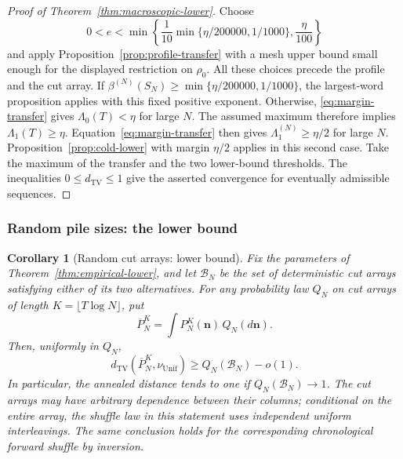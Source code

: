 \documentclass[11pt]{article}
\numberwithin{equation}{section}
\newtheorem{corollary}[theorem]{Corollary}
\theoremstyle{definition}
\theoremstyle{remark}
\newcommand{\TV}{\mathrm{TV}}
\newcommand{\Unif}{\mathrm{Unif}}
\newcommand{\dTV}{d_{\TV}}
\newcommand{\nuUnif}{\nu_{\Unif}}
\newcommand{\1}{\mathbf 1}
\begin{document}
\begin{proof}[Proof of Theorem~\ref{thm:macroscopic-lower}]
Choose
\[
 0<e<\min\left\{\frac1{10}\min\{\eta/200000,1/1000\},
                          \frac{\eta}{100}\right\}
\]
and apply Proposition~\ref{prop:profile-transfer} with a mesh upper bound
small enough for the displayed restriction on $\rho_0$. All these choices
precede the profile and the cut array. If
$\beta^{(N)}(S_N)\ge\min\{\eta/200000,1/1000\}$, the largest-word
proposition applies with this fixed positive exponent. Otherwise,
\eqref{eq:margin-transfer} gives $\Lambda_0(T)<\eta$ for
large $N$. The assumed maximum therefore implies $\Lambda_1(T)\ge\eta$.
Equation~\eqref{eq:margin-transfer} then gives
$\Lambda_1^{(N)}\ge\eta/2$ for large $N$. Proposition~\ref{prop:cold-lower}
with margin $\eta/2$ applies in this second case. Take the maximum of the
transfer and the two lower-bound thresholds. The inequalities
$0\le\dTV\le1$ give the asserted convergence for eventually admissible
sequences.
\end{proof}







\subsubsection{Random pile sizes: the lower bound}

\begin{corollary}[Random cut arrays: lower bound]
\label{cor:lower-random}
Fix the parameters of Theorem~\ref{thm:empirical-lower}, and let
$\mathcal B_N$ be the set of deterministic cut arrays satisfying
either of its two alternatives. For any probability law $Q_N$ on
cut arrays of length $K=\lfloor T\log N\rfloor$, put
\[
 \overline P_N^K=\int P_N^K(\mathbf n)\,Q_N(d\mathbf n).
\]
Then, uniformly in $Q_N$,
\[
 \dTV(\overline P_N^K,\nuUnif)\ge Q_N(\mathcal B_N)-o(1).
\]
In particular, the annealed distance tends to one if
$Q_N(\mathcal B_N)\to1$. The cut arrays may have arbitrary
dependence between their columns; conditional on the entire array,
the shuffle law in this statement uses independent uniform
interleavings. The same conclusion holds for the corresponding
chronological forward shuffle by inversion.
\end{corollary}
\end{document}
